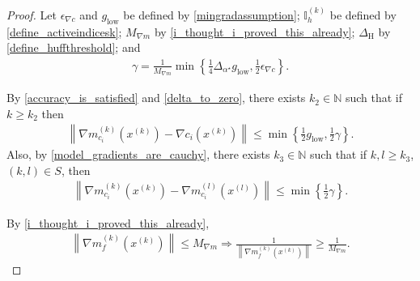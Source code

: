 \documentclass{article}
\theoremstyle{case}
\numberwithin{theorem}{subsection}
\newcommand{\gk}{{\nabla m_f^{(k)}\left(\xk\right)}}
\newcommand{\gmcik}{{\nabla m_{c_i}^{(k)}\left(\xk\right)}}
\newcommand{\gmcil}{{\nabla m_{c_i}^{(l)}\left(\xl\right)}}
\newcommand{\minangledelta}{{\Delta_{\alpha^{\star}}}}
\newcommand{\mingradepsilon}{{\epsilon_{\nabla c}}}
\newcommand{\mingrad}{{ g_{\textrm{low}} }}
\newcommand{\naturals}{\mathbb N}
\newcommand{\xk}{x^{(k)}}
\newcommand{\xl}{{x^{(l)}}}
\newcommand{\maxmodelgrad}{{M_{\nabla m}}}
\newcommand{\activeindicesk}{{ \mathbb I_h^{(k)} }}
\newcommand{\huffthreshold}{{\Delta_{\textrm{H}}}}
\begin{document}
\begin{proof}
Let $\mingradepsilon$ and $\mingrad$ be defined by \cref{mingradassumption};
$\activeindicesk$ be defined by \cref{define_activeindicesk};
$\maxmodelgrad$ by \cref{i_thought_i_proved_this_already};
$\huffthreshold$ by \cref{define_huffthreshold};
and 
\begin{align*}
\gamma = \frac{1}{\maxmodelgrad} \min\left\{\frac 1 4 \minangledelta \mingrad, \frac 1 2 \mingradepsilon\right\}.
\end{align*}


By \cref{accuracy_is_satisfied} and \cref{delta_to_zero}, there exists $k_2 \in \naturals$ such that if $k \ge k_2$ then
\begin{align}
\label{hcohiab_mctc}
\left\|\gmcik - \nabla c_i\left(\xk\right) \right\| \le \min\left\{\frac 1 2 \mingrad, \frac 1 2 \gamma\right\}.
\end{align}
Also, by \cref{model_gradients_are_cauchy}, there exists $k_3 \in \naturals$ such that if $k, l \ge k_3$, $(k, l) \in S$, then
\begin{align}
\label{hcohiab_mlctmk}
\left\|\gmcik - \gmcil \right\| \le \min\left\{\frac 1 2 \gamma\right\}.
\end{align}

By \cref{i_thought_i_proved_this_already},
\begin{align*}
\left\|\gk\right\| \le \maxmodelgrad \Longrightarrow 
\frac 1 {\left\|\gk\right\|} \ge \frac 1 {\maxmodelgrad}.
\end{align*}



\end{proof}
\end{document}
